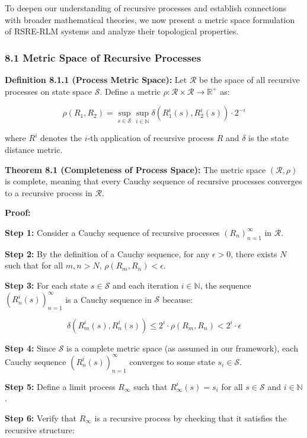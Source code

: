 \documentclass[
]{article}
\begin{document}
To deepen our understanding of recursive processes and establish
connections with broader mathematical theories, we now present a metric
space formulation of RSRE-RLM systems and analyze their topological
properties.

\subsubsection{8.1 Metric Space of Recursive
Processes}\label{metric-space-of-recursive-processes}

\textbf{Definition 8.1.1 (Process Metric Space):} Let \(\mathcal{R}\) be
the space of all recursive processes on state space \(\mathcal{S}\).
Define a metric
\(\rho: \mathcal{R} \times \mathcal{R} \rightarrow \mathbb{R}^+\) as:

\[\rho(R_1, R_2) = \sup_{s \in \mathcal{S}} \sup_{i \in \mathbb{N}} \delta(R_1^i(s), R_2^i(s)) \cdot 2^{-i}\]

where \(R^i\) denotes the \(i\)-th application of recursive process
\(R\) and \(\delta\) is the state distance metric.

\textbf{Theorem 8.1 (Completeness of Process Space):} The metric space
\((\mathcal{R}, \rho)\) is complete, meaning that every Cauchy sequence
of recursive processes converges to a recursive process in
\(\mathcal{R}\).

\textbf{Proof:}

\textbf{Step 1:} Consider a Cauchy sequence of recursive processes
\((R_n)_{n=1}^{\infty}\) in \(\mathcal{R}\).

\textbf{Step 2:} By the definition of a Cauchy sequence, for any
\(\epsilon > 0\), there exists \(N\) such that for all \(m, n > N\),
\(\rho(R_m, R_n) < \epsilon\).

\textbf{Step 3:} For each state \(s \in \mathcal{S}\) and each iteration
\(i \in \mathbb{N}\), the sequence \((R_n^i(s))_{n=1}^{\infty}\) is a
Cauchy sequence in \(\mathcal{S}\) because:

\[\delta(R_m^i(s), R_n^i(s)) \leq 2^i \cdot \rho(R_m, R_n) < 2^i \cdot \epsilon\]

\textbf{Step 4:} Since \(\mathcal{S}\) is a complete metric space (as
assumed in our framework), each Cauchy sequence
\((R_n^i(s))_{n=1}^{\infty}\) converges to some state
\(s_i \in \mathcal{S}\).

\textbf{Step 5:} Define a limit process \(R_{\infty}\) such that
\(R_{\infty}^i(s) = s_i\) for all \(s \in \mathcal{S}\) and
\(i \in \mathbb{N}\).

\textbf{Step 6:} Verify that \(R_{\infty}\) is a recursive process by
checking that it satisfies the recursive structure:
\end{document}
